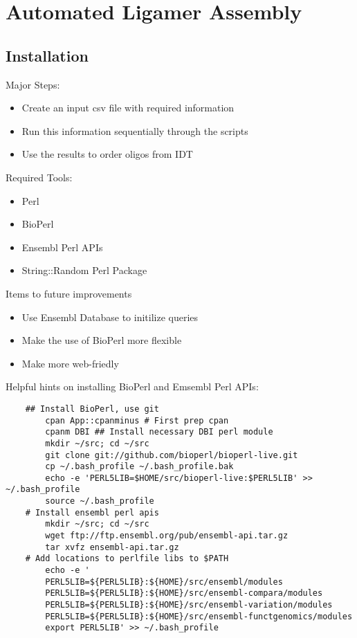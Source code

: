 \chapter{Automated Ligamer Assembly}\label{AppendixC} 

\section{Installation}

Major Steps:
\begin{itemize}
	\item  Create an input csv file with required information
	\item  Run this information sequentially through the scripts
	\item  Use the results to order oligos from IDT
\end{itemize}

Required Tools:
\begin{itemize}
	\item  Perl
	\item  BioPerl
	\item  Ensembl Perl APIs
	\item  String::Random Perl Package
\end{itemize}

Items to future improvements
\begin{itemize}
	\item Use Ensembl Database to initilize queries
	\item Make the use of BioPerl more flexible
	\item Make more web-friedly
\end{itemize}

Helpful hints on installing BioPerl and Emsembl Perl APIs:

\lstset{language=BASH}
\begin{lstlisting}
	## Install BioPerl, use git
	    cpan App::cpanminus # First prep cpan
	    cpanm DBI ## Install necessary DBI perl module
	    mkdir ~/src; cd ~/src
	    git clone git://github.com/bioperl/bioperl-live.git
	    cp ~/.bash_profile ~/.bash_profile.bak
	    echo -e 'PERL5LIB=$HOME/src/bioperl-live:$PERL5LIB' >> ~/.bash_profile
	    source ~/.bash_profile
	# Install ensembl perl apis
	    mkdir ~/src; cd ~/src
	    wget ftp://ftp.ensembl.org/pub/ensembl-api.tar.gz
	    tar xvfz ensembl-api.tar.gz
	# Add locations to perlfile libs to $PATH
	    echo -e '
	    PERL5LIB=${PERL5LIB}:${HOME}/src/ensembl/modules
	    PERL5LIB=${PERL5LIB}:${HOME}/src/ensembl-compara/modules
	    PERL5LIB=${PERL5LIB}:${HOME}/src/ensembl-variation/modules
	    PERL5LIB=${PERL5LIB}:${HOME}/src/ensembl-functgenomics/modules
	    export PERL5LIB' >> ~/.bash_profile
\end{lstlisting}


